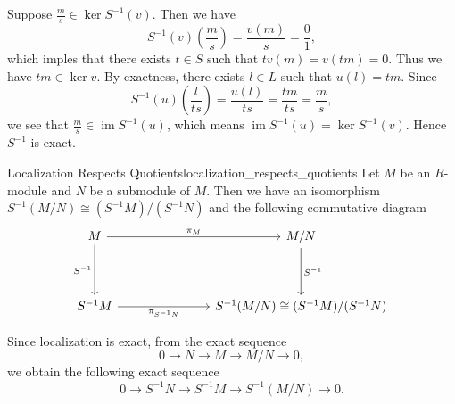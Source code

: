 \begin{prf}
    Suppose $\frac{m}{s}\in \ker S^{-1}(v) $. Then we have
    \[
        S^{-1}(v)\left(\frac{m}{s}\right)=\frac{v(m)}{s}=\frac{0}{1},
    \]
    which imples that there exists $t\in S$ such that $tv(m)=v(tm)=0$. Thus we have $tm\in \ker v$. By exactness, there exists $l\in L$ such that $u(l)=tm$. Since 
    \[
        S^{-1}(u)\left(\frac{l}{ts}\right)=\frac{u(l)}{ts}=\frac{tm}{ts}=\frac{m}{s},
    \]
    we see that $\frac{m}{s}\in \operatorname{im}S^{-1}(u)$, which means $\operatorname{im}S^{-1}(u)=\ker S^{-1}(v)$. Hence $S^{-1}$ is exact.
\end{prf}

\begin{proposition}{Localization Respects Quotients}{localization_respects_quotients}
    Let $M$ be an $R$-module and $N$ be a submodule of $M$. Then we have an isomorphism $S^{-1}(M/N)\cong (S^{-1}M)/(S^{-1}N)$ and the following commutative diagram
    \[
        \begin{tikzcd}
            M \arrow[r, "\pi_M"] \arrow[d, "S^{-1}"'] &[+5em] M/N \arrow[d, "S^{-1}"]              \\[+2em]
            S^{-1}M \arrow[r, "\pi_{S^{-1}N}"']       & S^{-1}(M/N)\cong (S^{-1}M)/(S^{-1}N)
            \end{tikzcd}
    \]
\end{proposition}

\begin{prf}
    Since localization is exact, from the exact sequence
    \[
        0\longrightarrow N\longrightarrow M\longrightarrow M/N\longrightarrow 0,
    \]
    we obtain the following exact sequence
    \[
        0\longrightarrow S^{-1}N\longrightarrow S^{-1}M\longrightarrow S^{-1}(M/N)\longrightarrow 0.
    \]
\end{prf}

